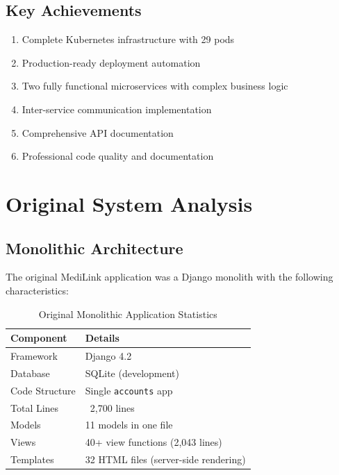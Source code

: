 \documentclass[12pt,a4paper]{article}
\begin{document}
\subsection{Key Achievements}
\begin{enumerate}
    \item Complete Kubernetes infrastructure with 29 pods
    \item Production-ready deployment automation
    \item Two fully functional microservices with complex business logic
    \item Inter-service communication implementation
    \item Comprehensive API documentation
    \item Professional code quality and documentation
\end{enumerate}

\section{Original System Analysis}

\subsection{Monolithic Architecture}
The original MediLink application was a Django monolith with the following characteristics:

\begin{table}[h]
\centering
\begin{tabular}{@{}ll@{}}
\toprule
\textbf{Component} & \textbf{Details} \\
\midrule
Framework & Django 4.2 \\
Database & SQLite (development) \\
Code Structure & Single \texttt{accounts} app \\
Total Lines & ~2,700 lines \\
Models & 11 models in one file \\
Views & 40+ view functions (2,043 lines) \\
Templates & 32 HTML files (server-side rendering) \\
\bottomrule
\end{tabular}
\caption{Original Monolithic Application Statistics}
\end{table}
\end{document}

